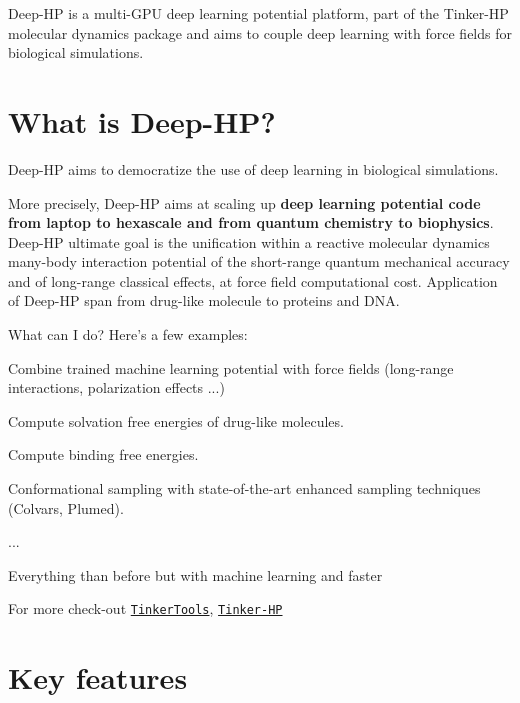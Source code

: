 Deep-\/\-H\-P is a multi-\/\-G\-P\-U deep learning potential platform, part of the Tinker-\/\-H\-P molecular dynamics package and aims to couple deep learning with force fields for biological simulations.

\section*{What is Deep-\/\-H\-P?}

Deep-\/\-H\-P aims to democratize the use of deep learning in biological simulations. \par
 More precisely, Deep-\/\-H\-P aims at scaling up {\bfseries deep learning potential code from laptop to hexascale and from quantum chemistry to biophysics}. Deep-\/\-H\-P ultimate goal is the unification within a reactive molecular dynamics many-\/body interaction potential of the short-\/range quantum mechanical accuracy and of long-\/range classical effects, at force field computational cost. Application of Deep-\/\-H\-P span from drug-\/like molecule to proteins and D\-N\-A.

What can I do? Here's a few examples\-:
\begin{DoxyItemize}
\item Combine trained machine learning potential with force fields (long-\/range interactions, polarization effects ...)
\item Compute solvation free energies of drug-\/like molecules.
\item Compute binding free energies.
\item Conformational sampling with state-\/of-\/the-\/art enhanced sampling techniques (Colvars, Plumed).
\item ...
\item Everything than before but with machine learning and faster
\item For more check-\/out \href{https://tinkertools.org/}{\tt Tinker\-Tools}, \href{https://tinker-hp.org/}{\tt Tinker-\/\-H\-P}
\end{DoxyItemize}

\section*{Key features}


